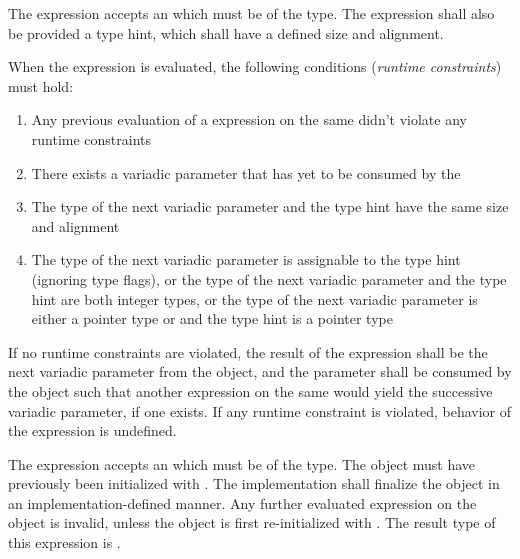 \specsubsubitem
The  expression accepts an  which
must be of the  type. The expression shall also be provided a
type hint, which shall have a defined size and alignment.

\specsubsubitem
When the  expression is evaluated, the following conditions
(\textit{runtime constraints}) must hold:

\begin{enumerate}
\item Any previous evaluation of a  expression on the same
	 didn't violate any runtime constraints
\item There exists a variadic parameter that has yet to be consumed by the
\item The type of the next variadic parameter and the type hint have the same
	size and alignment
\item The type of the next variadic parameter is assignable to the type hint
	(ignoring type flags), or the type of the next variadic parameter and
	the type hint are both integer types, or the type of the next variadic
	parameter is either a pointer type or  and the type hint
	is a pointer type
\end{enumerate}

\specsubsubitem
If no runtime constraints are violated, the result of the 
expression shall be the next variadic parameter from the 
object, and the parameter shall be consumed by the object such that another
 expression on the same  would
yield the successive variadic parameter, if one exists. If any runtime
constraint is violated, behavior of the  expression is
undefined.

\specsubsubitem
The  expression accepts an  which
must be of the  type. The object must have previously been
initialized with . The implementation shall finalize the
 object in an implementation-defined manner. Any further
evaluated  expression on the object is invalid, unless the
object is first re-initialized with . The result type of this
expression is .


\begin{grammar}
 \\
	 \\
	 \\
	 \\
	 \\
	 \\
	 \\
	 \\
\end{grammar}

